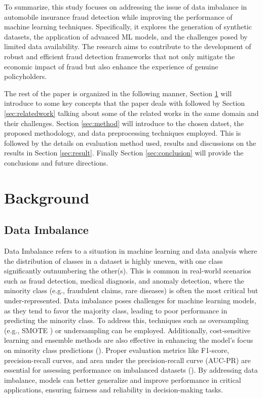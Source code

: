 \documentclass[twoside,11pt]{article}
\begin{document}
To summarize, this study focuses on addressing the issue of data imbalance in automobile insurance fraud detection while improving the performance of machine learning techniques. Specifically, it explores the generation of synthetic datasets, the application of advanced ML models, and the challenges posed by limited data availability. The research aims to contribute to the development of robust and efficient fraud detection frameworks that not only mitigate the economic impact of fraud but also enhance the experience of genuine policyholders.

The rest of the paper is organized in the following manner, Section \ref{sec:background} will introduce to some key concepts that the paper deals with followed by Section \ref{sec:relatedwork} talking about some of the related works in the same domain and their challenges. Section \ref{sec:method} will introduce to the chosen datset, the proposed methodology, and data preprocessing techniques employed. This is followed by the details on evaluation method used, results and discussions on the results in Section \ref{sec:result}. Finally Section \ref{sec:conclusion} will provide the conclusions and future directions.

\section{Background} \label{sec:background}
\subsection{Data Imbalance}
Data Imbalance refers to a situation in machine learning and data analysis where the distribution of classes in a dataset is highly uneven, with one class significantly outnumbering the other(s). This is common in real-world scenarios such as fraud detection, medical diagnosis, and anomaly detection, where the minority class (e.g., fraudulent claims, rare diseases) is often the most critical but under-represented. Data imbalance poses challenges for machine learning models, as they tend to favor the majority class, leading to poor performance in predicting the minority class.
To address this, techniques such as oversampling (e.g., SMOTE \citealp{chawlaSMOTESyntheticMinority2002}) or undersampling can be employed. Additionally, cost-sensitive learning and ensemble methods are also effective in enhancing the model's focus on minority class predictions (\citealp{garcia2009}). Proper evaluation metrics like F1-score, precision-recall curves, and area under the precision-recall curve (AUC-PR) are essential for assessing performance on imbalanced datasets (\citealp{fernandezPerformanceMeasures2018a}).
By addressing data imbalance, models can better generalize and improve performance in critical applications, ensuring fairness and reliability in decision-making tasks.
\end{document}

